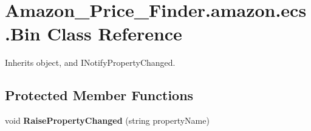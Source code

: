 \hypertarget{class_amazon___price___finder_1_1amazon_1_1ecs_1_1_bin}{\section{Amazon\-\_\-\-Price\-\_\-\-Finder.\-amazon.\-ecs.\-Bin Class Reference}
\label{class_amazon___price___finder_1_1amazon_1_1ecs_1_1_bin}
}


 




Inherits object, and I\-Notify\-Property\-Changed.

\subsection*{Protected Member Functions}
\begin{DoxyCompactItemize}
\item 
\hypertarget{class_amazon___price___finder_1_1amazon_1_1ecs_1_1_bin_a880ab7567f0b75061dcbabd17aa0bb49}{void {\bfseries Raise\-Property\-Changed} (string property\-Name)}\label{class_amazon___price___finder_1_1amazon_1_1ecs_1_1_bin_a880ab7567f0b75061dcbabd17aa0bb49}

\end{DoxyCompactItemize}
